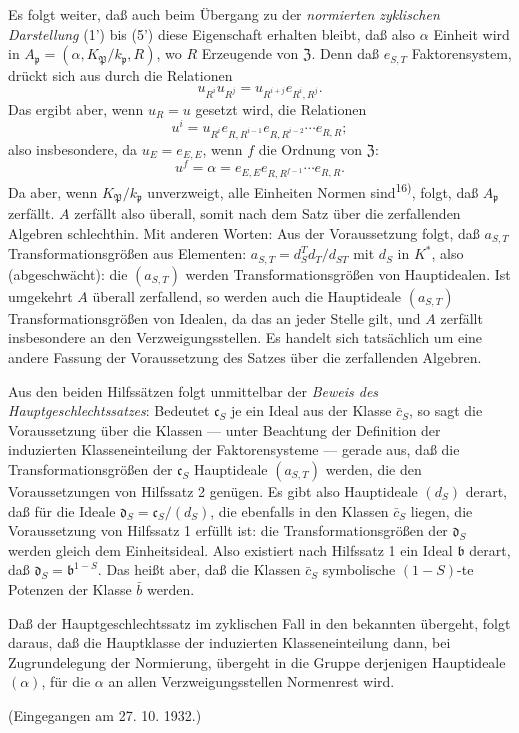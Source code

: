 Es folgt weiter, daß auch beim Übergang zu der \emph{normierten zyklischen Darstellung} (1') bis (5') diese Eigenschaft erhalten bleibt, daß also \(\alpha\) Einheit wird in \(A_{\mathfrak p}=(\alpha,K_{\mathfrak P}/k_{\mathfrak p},R)\), wo \(R\) Erzeugende von \(\mathfrak Z\). Denn daß \(e_{S,T}\) Faktorensystem, drückt sich aus durch die Relationen
\[
u_{R^i}u_{R^j}=u_{R^{i+j}}e_{R^i,R^j}.
\]
Das ergibt aber, wenn \(u_R=u\) gesetzt wird, die Relationen
\[
u^i=u_{R^i}e_{R,R^{i-1}}e_{R,R^{i-2}}\cdots e_{R,R};
\]
also insbesondere, da \(u_E=e_{E,E}\), wenn \(f\) die Ordnung von \(\mathfrak Z\):
\[
u^f=\alpha=e_{E,E}e_{R,R^{f-1}}\cdots e_{R,R}.
\]
Da aber, wenn \(K_{\mathfrak P}/k_{\mathfrak p}\) unverzweigt, alle Einheiten Normen sind\textsuperscript{16)}, folgt, daß \(A_{\mathfrak p}\) zerfällt. \(A\) zerfällt also überall, somit nach dem Satz über die zerfallenden Algebren schlechthin. Mit anderen Worten: Aus der Voraussetzung folgt, daß \(a_{S,T}\) Transformationsgrößen aus Elementen: \(a_{S,T}=d_S^Td_T/d_{ST}\) mit \(d_S\) in \(K^*\), also (abgeschwächt): die \((a_{S,T})\) werden Transformationsgrößen von Hauptidealen. Ist umgekehrt \(A\) überall zerfallend, so werden auch die Hauptideale \((a_{S,T})\) Transformationsgrößen von Idealen, da das an jeder Stelle gilt, und \(A\) zerfällt insbesondere an den Verzweigungsstellen. Es handelt sich tatsächlich um eine andere Fassung der Voraussetzung des Satzes über die zerfallenden Algebren.

Aus den beiden Hilfssätzen folgt unmittelbar der \emph{Beweis des Hauptgeschlechtssatzes}: Bedeutet \(\mathfrak c_S\) je ein Ideal aus der Klasse \(\bar c_S\), so sagt die Voraussetzung über die Klassen --- unter Beachtung der Definition der induzierten Klasseneinteilung der Faktorensysteme --- gerade aus, daß die Transformationsgrößen der \(\mathfrak c_S\) Hauptideale \((a_{S,T})\) werden, die den Voraussetzungen von Hilfssatz 2 genügen. Es gibt also Hauptideale \((d_S)\) derart, daß für die Ideale \(\mathfrak d_S=\mathfrak c_S/(d_S)\), die ebenfalls in den Klassen \(\bar c_S\) liegen, die Voraussetzung von Hilfssatz 1 erfüllt ist: die Transformationsgrößen der \(\mathfrak d_S\) werden gleich dem Einheitsideal. Also existiert nach Hilfssatz 1 ein Ideal \(\mathfrak b\) derart, daß \(\mathfrak d_S=\mathfrak b^{1-S}\). Das heißt aber, daß die Klassen \(\bar c_S\) symbolische \((1-S)\)-te Potenzen der Klasse \(\bar b\) werden.

Daß der Hauptgeschlechtssatz im zyklischen Fall in den bekannten übergeht, folgt daraus, daß die Hauptklasse der induzierten Klasseneinteilung dann, bei Zugrundelegung der Normierung, übergeht in die Gruppe derjenigen Hauptideale \((\alpha)\), für die \(\alpha\) an allen Verzweigungsstellen Normenrest wird.

\begin{center}
(Eingegangen am 27. 10. 1932.)
\end{center}

\clearpage
\setcounter{footnote}{0}
